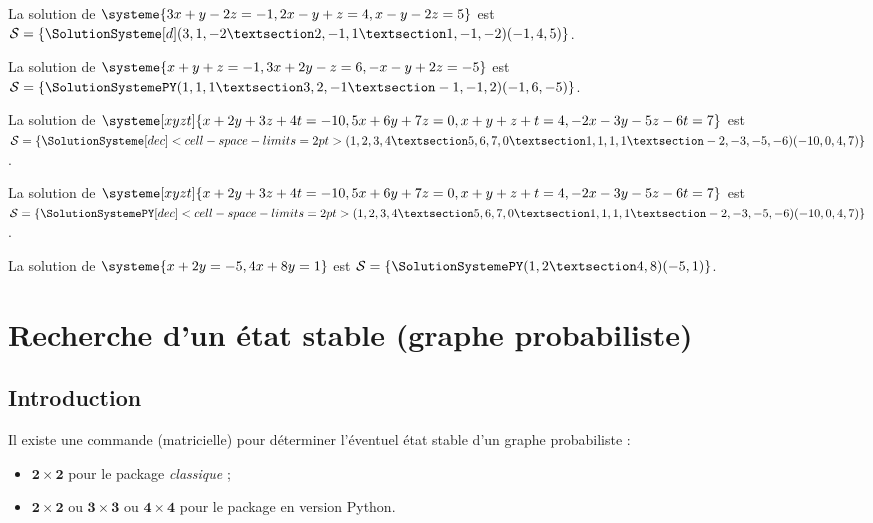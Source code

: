 \documentclass[french,a4paper,11pt]{article}
\newcommand\cmaj[1]{\tcbox[vignetteMaJ]{#1}\xspace}
\begin{document}
\begin{PresentationCode}{}
La solution de $\systeme{3x+y-2z=-1,2x-y+z=4,x-y-2z=5}$ est $\mathcal{S}=%
\left\lbrace \SolutionSysteme[d](3,1,-2 § 2,-1,1 § 1,-1,-2)(-1,4,5) \right\rbrace$.\\
\end{PresentationCode}

\begin{PresentationCode}{}
La solution de $\systeme{x+y+z=-1,3x+2y-z=6,-x-y+2z=-5}$ est $\mathcal{S}=%
\left\lbrace \SolutionSystemePY(1,1,1 § 3,2,-1 § -1,-1,2)(-1,6,-5) \right\rbrace$.
\end{PresentationCode}

\begin{PresentationCode}{}
La solution de $\systeme[xyzt]{x+2y+3z+4t=-10,5x+6y+7z=0,x+y+z+t=4,-2x-3y-5z-6t=7}$
est $\mathcal{S}=%
	\left\lbrace
		\SolutionSysteme%
		[dec]<cell-space-limits=2pt>%
		(1,2,3,4 § 5,6,7,0 § 1,1,1,1 § -2,-3,-5,-6)(-10,0,4,7)%
\right\rbrace$.
\end{PresentationCode}

\begin{PresentationCode}{}
La solution de $\systeme[xyzt]{x+2y+3z+4t=-10,5x+6y+7z=0,x+y+z+t=4,-2x-3y-5z-6t=7}$
est $\mathcal{S}=%
\left\lbrace
	\SolutionSystemePY%
		[dec]<cell-space-limits=2pt>%
		(1,2,3,4 § 5,6,7,0 § 1,1,1,1 § -2,-3,-5,-6)(-10,0,4,7)%
\right\rbrace$.
\end{PresentationCode}

\begin{PresentationCode}{}
La solution de $\systeme{x+2y=-5,4x+8y=1}$ est $\mathcal{S}=%
\left\lbrace \SolutionSystemePY(1,2 § 4,8)(-5,1) \right\rbrace$.
\end{PresentationCode}

\pagebreak

\section{Recherche d'un état stable (graphe probabiliste)}

\subsection{Introduction}

\begin{cautionblock}
\cmaj{0.1.4} Il existe une commande (matricielle) pour déterminer l'éventuel état stable d'un graphe probabiliste :

\begin{itemize}
	\item $\mathbf{2\times2}$ pour le package \textit{classique} ;
	\item $\mathbf{2\times2}$ ou $\mathbf{3\times3}$ ou $\mathbf{4\times4}$ pour le package en version \textsf{Python}.
\end{itemize}
\vspace*{-\baselineskip}\leavevmode
\end{cautionblock}
\end{document}
